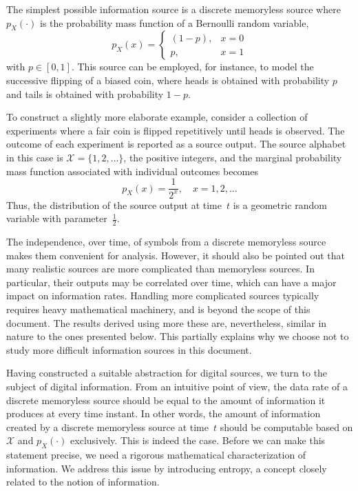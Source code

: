 \begin{example} \label{example:BinarySource}
The simplest possible information source is a discrete memoryless source where $p_X(\cdot)$ is the probability mass function of a Bernoulli random variable,
\begin{equation*}
p_X(x) = \begin{cases} (1 - p), & x = 0 \\
p, & x = 1 \end{cases}
\end{equation*}
with $p \in [0,1]$.
This source can be employed, for instance, to model the successive flipping of a biased coin, where heads is obtained with probability $p$ and tails is obtained with probability $1 - p$.
\end{example}

\begin{example}
To construct a slightly more elaborate example, consider a collection of experiments where a fair coin is flipped repetitively until heads is observed.
The outcome of each experiment is reported as a source output.
The source alphabet in this case is $\mathcal{X} = \{1, 2, \ldots \}$, the positive integers, and the marginal probability mass function associated with individual outcomes becomes
\begin{equation*}
p_X (x) = \frac{1}{2^x}, \quad x = 1, 2, \ldots
\end{equation*}
Thus, the distribution of the source output at time~$t$ is a geometric random variable with parameter~$\frac{1}{2}$.
\end{example}

The independence, over time, of symbols from a discrete memoryless source makes them convenient for analysis.
However, it should also be pointed out that many realistic sources are more complicated than memoryless sources.
In particular, their outputs may be correlated over time, which can have a major impact on information rates.
Handling more complicated sources typically requires heavy mathematical machinery, and is beyond the scope of this document.
The results derived using more these are, nevertheless, similar in nature to the ones presented below.
This partially explains why we choose not to study more difficult information sources in this document.

Having constructed a suitable abstraction for digital sources, we turn to the subject of digital information.
From an intuitive point of view, the data rate of a discrete memoryless source should be equal to the amount of information it produces at every time instant.
In other words, the amount of information created by a discrete memoryless source at time~$t$ should be computable based on $\mathcal{X}$ and $p_X(\cdot)$ exclusively.
This is indeed the case.
Before we can make this statement precise, we need a rigorous mathematical characterization of information.
We address this issue by introducing entropy, a concept closely related to the notion of information.


